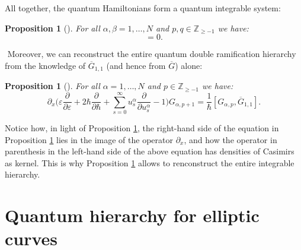 \documentclass{amsart}
\numberwithin{equation}{section} %
\theoremstyle{plain}
\newtheorem{prop}[theorem]{Proposition}
\theoremstyle{remark}
\begin{document}
All together, the quantum Hamiltonians form a quantum integrable system:
\begin{prop}[\cite{buryak_rossi_15}]\label{proposition:commutativity}
	For all $\alpha,\beta=1,\ldots,N$ and $p,q\in\mathbb{Z}_{\geq -1}$ we have:
	\begin{equation*}
		[\overline{G}_{\alpha ,q} ,\overline{G}_{\beta ,q}] =0.
	\end{equation*}
\end{prop}
﻿
Moreover, we can reconstruct the entire quantum double ramification hierarchy from the knowledge of $\overline{G}_{1,1}$ (and hence from $\overline{G}$) alone: 
\begin{prop}[\cite{buryak_rossi_15}] \label{prop:recursion relation for qHam}
For all $\alpha=1,\ldots,N$ and $p\in\mathbb{Z}_{\geq -1}$ we have:
\begin{equation*}
\partial _{x}\Big( \varepsilon \frac{\partial}{\partial \varepsilon} + 2\hbar \frac{\partial}{\partial \hbar} + \sum_{s=0}^\infty u^{\alpha}_s \frac{\partial}{\partial u^{\alpha}_s}-1\Big) G_{\alpha ,p+1} =\frac{1}{\hbar }[ G_{\alpha ,p} ,\overline{G}_{1,1}].
\end{equation*}
\end{prop}
﻿Notice how, in light of Proposition \ref{proposition:commutativity}, the right-hand side of the equation in Proposition \ref{prop:recursion relation for qHam} lies in the image of the operator $\partial_x$, and how the operator in parenthesis in the left-hand side of the above equation has densities of Casimirs as kernel. This is why Proposition \ref{prop:recursion relation for qHam} allows to renconstruct the entire integrable hierarchy.
﻿
\section{Quantum hierarchy for elliptic curves}
\end{document}
